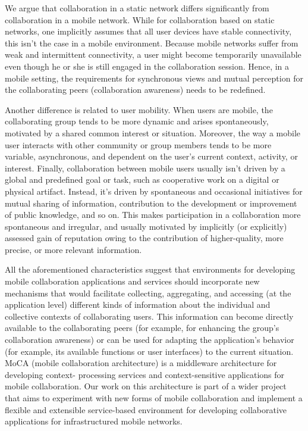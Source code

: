 \documentclass[twocolumn]{article}
\begin{document}
We argue that collaboration in a static network differs significantly from collaboration in a mobile network. While for collaboration based on static networks, one implicitly assumes that all user devices have stable connectivity, this isn't the case in a mobile environment. Because mobile networks suffer from weak and intermittent connectivity, a user might become temporarily unavailable even though he or she is still engaged in the collaboration session. Hence, in a mobile setting, the requirements for synchronous views and mutual perception for the collaborating peers (collaboration awareness) needs to be redefined.

Another difference is related to user mobility. When users are mobile, the collaborating group tends to be more dynamic and arises spontaneously, motivated by a shared common interest or situation. Moreover, the way a mobile user interacts with other community or group members tends to be more variable, asynchronous, and dependent on the user's current context, activity, or interest.
Finally, collaboration between mobile users usually isn't driven by a global and predefined goal or task, such as cooperative work on a digital or physical artifact. Instead, it's driven by spontaneous and occasional initiatives for mutual sharing of information, contribution to the development or improvement of public knowledge, and so on. This makes participation in a collaboration more spontaneous and irregular, and usually motivated by implicitly (or explicitly) assessed gain of reputation owing to the contribution of higher-quality, more precise, or more relevant information.

All the aforementioned characteristics suggest that environments for developing mobile collaboration applications and services should incorporate new mechanisms that would facilitate collecting, aggregating, and accessing (at the application level) different kinds of information about the individual and collective contexts of collaborating users. This information can become directly available to the collaborating peers (for example, for enhancing the group's collaboration awareness) or can be used for adapting the application's behavior (for example, its available functions or user interfaces) to the current situation.
MoCA (mobile collaboration architecture) is a middleware architecture for developing context- processing services and context-sensitive applications for mobile collaboration. Our work on this architecture is part of a wider project that aims to experiment with new forms of mobile collaboration and implement a flexible and extensible service-based environment for developing collaborative applications for infrastructured mobile networks.
\end{document}

